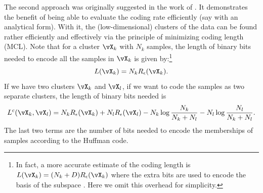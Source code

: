 \documentclass[../../book-main.tex]{subfiles}
\begin{document}
The second approach was originally suggested in the work of
\cite{ma2007segmentation}. It demonstrates the benefit of being able
to evaluate the coding rate efficiently (say with an analytical
form). With it, the (low-dimensional) clusters of the data can be
found rather efficiently and effectively via the principle of
minimizing coding length (MCL). Note that for a cluster $\vX_k$ with
$N_k$ samples, the length of binary bits needed to encode all the
samples in $\vX_k$ is given by:\footnote{In fact, a more accurate
    estimate of the coding length is $L(\vX_k) = (N_k+D) R_\epsilon(\vX_k)$
    where the extra bits are used to encode the basis of the subspace
\cite{ma2007segmentation}. Here we omit this overhead for simplicity.}
\begin{equation}
    L(\vX_k) = N_k R_\epsilon(\vX_k).
\end{equation}
If we have two clusters $\vX_k$ and $\vX_l$, if we want to code the
samples as two separate clusters, the length of binary bits needed is
\begin{equation*}
    L^c(\vX_k, \vX_l) = N_k R_\epsilon(\vX_k) + N_l R_\epsilon(\vX_l) -
    N_k \log\frac{N_k}{N_k + N_l} - N_l \log\frac{N_l}{N_k + N_l}.
\end{equation*}
The last two terms are the number of bits needed to encode the
memberships of samples according to the Huffman code.
\end{document}
